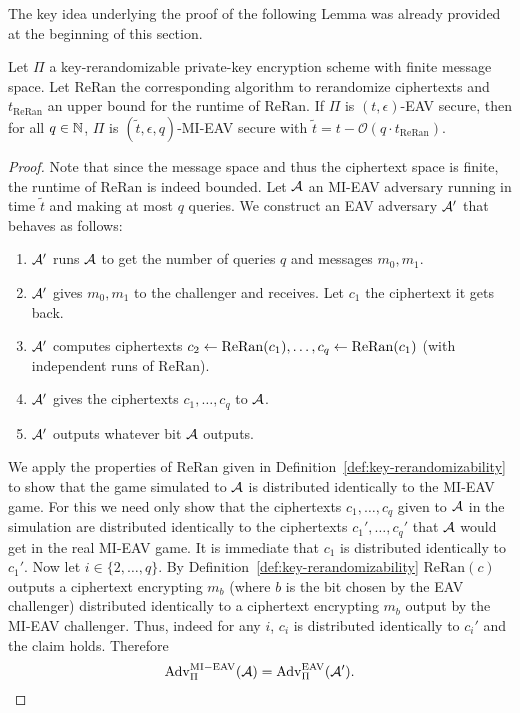 The key idea underlying the proof of the following Lemma was already provided at the beginning of this section.

\begin{lemma} \label{lemma:mi-eav-from-eav-with-key-rerandomizability}
	Let $\Pi$ a key-rerandomizable private-key encryption scheme with finite message space. Let $\mathrm{ReRan}$ the corresponding algorithm to rerandomize ciphertexts and $t_{\mathrm{ReRan}}$ an upper bound for the runtime of $\mathrm{ReRan}$. If $\Pi$ is $(t, \epsilon)$-EAV secure, then for all $q \in \mathbb{N}$, $\Pi$ is $(\tilde{t}, \epsilon, q)$-MI-EAV secure with $\tilde{t} = t - \mathcal{O}(q \cdot t_{\mathrm{ReRan}})$.
\end{lemma}

\begin{proof}
	Note that since the message space and thus the ciphertext space is finite, the runtime of $\mathrm{ReRan}$ is indeed bounded. Let $\mathcal{A}$ an MI-EAV adversary running in time $\tilde{t}$ and making at most $q$ queries. We construct an EAV adversary $\mathcal{A}'$ that behaves as follows:
	\begin{enumerate}[1.]
		\item $\mathcal{A}'$ runs $\mathcal{A}$ to get the number of queries $q$ and messages $m_0, m_1$.
		\item $\mathcal{A}'$ gives $m_0, m_1$ to the challenger and receives. Let $c_1$ the ciphertext it gets back.
		\item $\mathcal{A}'$ computes ciphertexts $c_2 \leftarrow \mathrm{ReRan}(c_1), \ldots, c_q \leftarrow \mathrm{ReRan}(c_1)$ (with independent runs of $\mathrm{ReRan}$).
		\item $\mathcal{A}'$ gives the ciphertexts $c_1, \ldots, c_q$ to $\mathcal{A}$.
		\item $\mathcal{A}'$ outputs whatever bit $\mathcal{A}$ outputs.
	\end{enumerate}
	We apply the properties of $\mathrm{ReRan}$ given in Definition~\ref{def:key-rerandomizability} to show that the game simulated to $\mathcal{A}$ is distributed identically to the MI-EAV game. For this we need only show that the ciphertexts $c_1, \ldots, c_q$ given to $\mathcal{A}$ in the simulation are distributed identically to the ciphertexts $c_1', \ldots, c_q'$ that $\mathcal{A}$ would get in the real MI-EAV game. It is immediate that $c_1$ is distributed identically to $c_1'$. Now let $i \in \{2, \ldots, q\}$. By Definition~\ref{def:key-rerandomizability} $\mathrm{ReRan}(c)$ outputs a ciphertext encrypting $m_b$ (where $b$ is the bit chosen by the EAV challenger) distributed identically to a ciphertext encrypting $m_b$ output by the MI-EAV challenger. Thus, indeed for any $i$, $c_i$ is distributed identically to $c_i'$ and the claim holds. Therefore
	\begin{equation} \label{eq:lemma-key-rerandomizability-advantage-same}
		\mathrm{Adv}_{\Pi}^{\mathrm{MI-EAV}}(\mathcal{A}) = \mathrm{Adv}_{\Pi}^{\mathrm{EAV}}(\mathcal{A}').
	\end{equation}


\end{proof}
